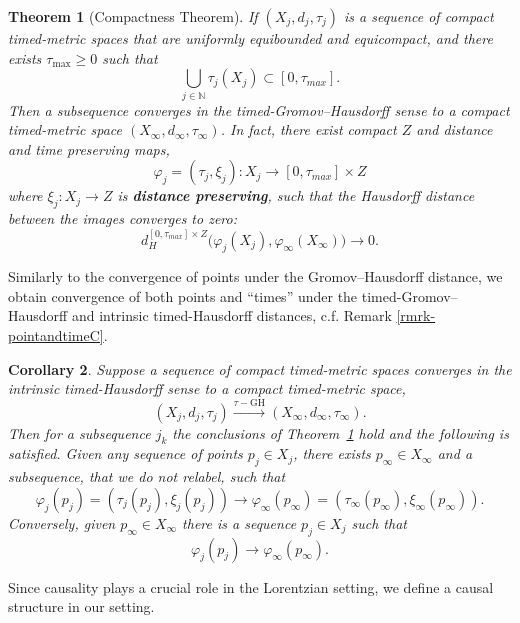 \documentclass[a4paper,12pt,reqno]{amsart}
\theoremstyle{plain}
\newtheorem{thm}{Theorem}[section]
\newtheorem{cor}[thm]{Corollary}
\newcommand{\tGHto}{\stackrel { \tau-\textrm{GH}}{\longrightarrow} }
\newcommand{\be}{\begin{equation}}
\newcommand{\ee}{\end{equation}}
\begin{document}
\begin{thm}[Compactness Theorem]\label{thm:timed-GH-compactness}
If $(X_j,d_j,\tau_j)$ is a sequence of compact timed-metric spaces that are uniformly equibounded
and equicompact, and there exists $\tau_{\max} \geq 0$ such that 
\be
\bigcup_{j \in \mathbb N} \tau_j(X_j)\subset [0,\tau_{max}].
\ee
Then a subsequence converges in the timed-Gromov--Hausdorff sense to a compact timed-metric space $(X_\infty, d_\infty, \tau_\infty)$. In fact, there exist
compact $Z$ and distance and time preserving maps,
\be\label{eq-TDmaps}
\varphi_j= (\tau_j, \xi_j): X_j \to [0,\tau_{max}]\times Z 
\ee
where $\xi_j:X_j \to Z$ is {\bf distance preserving}, such that the Hausdorff distance between the images converges to zero:
\be\label{eq-HausReal}
d_H^{[0,\tau_{max}]\times Z}\bigg(\varphi_j(X_j),\varphi_\infty(X_\infty)\bigg)\to 0.
\ee
\end{thm}




Similarly to the convergence of points under the Gromov–Hausdorff distance, we obtain convergence of both points and ``times'' under the timed-Gromov--Hausdorff and 
intrinsic timed-Hausdorff distances, c.f. Remark \ref{rmrk-pointandtimeC}.
 


\begin{cor}\label{cor:pointtimeConvergence}
Suppose a sequence of compact 
timed-metric spaces converges 
in the intrinsic timed-Hausdorff sense to a compact timed-metric space,
\begin{equation*}
(X_j,d_j,\tau_j)\tGHto
(X_\infty,d_\infty,\tau_\infty).
\end{equation*}
Then for a subsequence $j_k$ the conclusions of Theorem~\ref{thm:timed-GH-compactness}
hold and the following is satisfied. 
Given any sequence of points $p_j \in X_j$, there exists $p_\infty \in X_\infty$ and a subsequence, that we do not relabel, such that 
\be\label{eq-pointConv}
\varphi_j(p_j)=(\tau_j(p_j), \xi_j(p_j))\to \varphi_\infty(p_\infty)= (\tau_\infty(p_\infty), \xi_\infty(p_\infty)).
\ee
Conversely, given $p_\infty \in X_\infty$ there is a sequence $p_j\in X_j$ such that 
\be\label{eq-pointConv2}
\varphi_j(p_j) \to \varphi_\infty(p_\infty).
\ee
\end{cor}



\bigskip 




Since causality plays a crucial role in the Lorentzian setting, we define a causal structure in our setting. 
\end{document}
